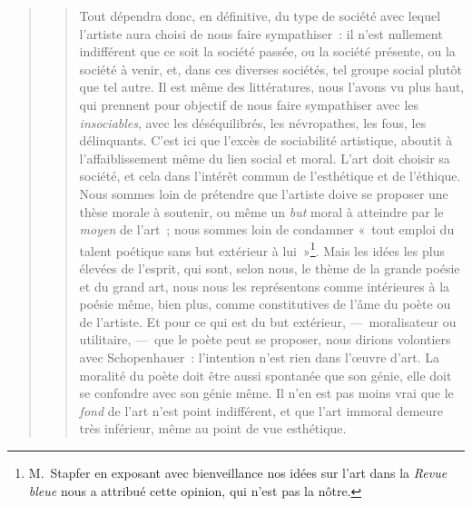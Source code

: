 \documentclass[french,twoside]{book} %
\begin{document}
\begin{verse}
\begin{verse}
Tout dépendra donc, en définitive, du type de société avec lequel l’artiste aura choisi de nous faire sympathiser : il n’est nullement indifférent que ce soit la société passée, ou la société présente, ou la société à venir, et, dans ces diverses sociétés, tel groupe social plutôt que tel autre. Il est même des littératures, nous l’avons vu plus haut, qui prennent pour objectif de nous faire sympathiser avec les \emph{insociables}, avec les déséquilibrés, les névropathes, les fous, les délinquants. C’est ici que l’excès de sociabilité artistique, aboutit à l’affaiblissement même du lien social et moral. L’art doit choisir sa société, et cela dans l’intérêt commun de l’esthétique et de l’éthique. Nous sommes loin de prétendre que l’artiste doive se proposer une thèse morale à soutenir, ou même un \emph{but} moral à atteindre par le \emph{moyen} de l’art ; nous sommes loin de condamner « tout emploi du talent poétique sans but extérieur à lui »\footnote{ M. Stapfer en exposant avec bienveillance nos idées sur l’art dans la \emph{Revue bleue} nous a attribué cette opinion, qui n’est pas la nôtre.}. Mais les idées les plus élevées de l’esprit, qui sont, selon nous, le thème de la grande poésie et du grand art, nous nous les représentons comme intérieures à la poésie même, bien plus, comme constitutives de l’âme du poète ou de l’artiste. Et pour ce qui est du but extérieur, — moralisateur ou utilitaire, — que le poète peut se proposer, nous dirions volontiers avec Schopenhauer : l’intention n’est rien dans l’œuvre d’art. La moralité du poète doit être aussi spontanée que son génie, elle doit se confondre avec son génie même. Il n’en est pas moins vrai que le \emph{fond} de l’art n’est point indifférent, et que l’art immoral demeure très inférieur, même au point de vue esthétique.\par

\end{verse}
\end{verse}
\end{document}
